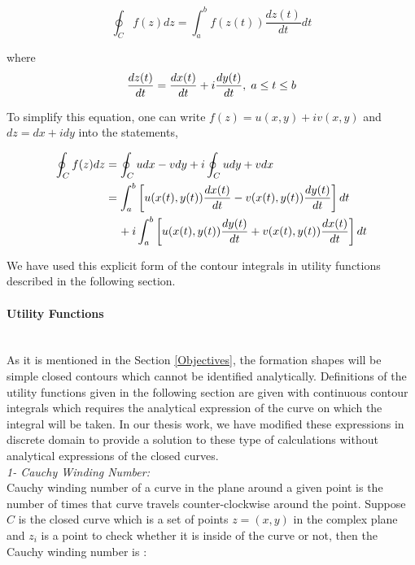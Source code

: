 \begin{equation}
\oint_C f(z) dz = \int_{a}^{b} f(z(t))\frac{dz(t)}{dt} dt
\end{equation}
		
where
\begin{equation}
\frac{dz(t)}{dt} = \frac{dx(t)}{dt} + i\frac{dy(t)}{dt},   \hspace{0.1cm} a\leq t\leq b
\end{equation}
		
To simplify this equation, one can write $f(z) = u(x,y) + iv(x,y)$ and $dz = dx + idy$ into the statements,
		
\begin{align} \label{contour_integral}
\begin{split}
\oint_C f(z)dz & = \oint_C u dx - v dy + i \oint_C u dy + v dx \\
&= \int_{a}^{b}\left[u(x(t),y(t) )\frac{dx(t)}{dt} - v(x(t),y(t) )\frac{dy(t)}{dt}\right]dt\\
& \hspace{0.4cm} + i\int_{a}^{b} \left[u(x(t),y(t) )\frac{dy(t)}{dt} + v(x(t),y(t) )\frac{dx(t)}{dt}\right]dt
\end{split}
\end{align}

We have used this explicit form of the contour integrals in utility functions described in the following section. 		
		
\paragraph{Utility Functions}\hspace{0pt} \\
As it is mentioned in the Section \ref{Objectives}, the formation shapes will be simple closed contours which cannot be identified analytically. Definitions of the utility functions given in the following section are given with continuous contour integrals which requires the analytical expression of the curve on which the integral will be taken. In our thesis work, we have modified these expressions in discrete domain to provide a solution to  these type of calculations without analytical expressions of the closed curves.\\

\textit{ 		1- Cauchy Winding Number:} \\ 
Cauchy winding number of a curve in the plane around a given point is the number of times that curve travels counter-clockwise around the point. Suppose $C$ is the closed curve which is a set of points $z=(x,y)$ in the complex plane  and $z_i$ is a point to check whether it is inside of the curve or not, then the Cauchy winding number is \cite{17} :
					
